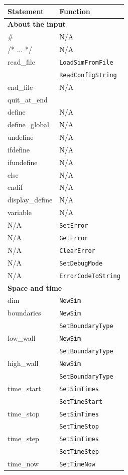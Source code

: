 \documentclass {book}
\newcommand {\ttt} {\texttt}
\begin{document}
\begin{longtable}[c]{ll}
Statement & Function\\
\hline
\multicolumn{2}{l}{\hspace{0.3in}\textbf{About the input}}\\
\hline
\# & N/A\\
/* ... */ & N/A\\
read\_file & \ttt{LoadSimFromFile}\\
& \ttt{ReadConfigString}\\
end\_file & N/A\\
quit\_at\_end \\ %
define & N/A\\
define\_global & N/A\\
undefine & N/A\\
ifdefine & N/A\\
ifundefine & N/A\\
else & N/A\\
endif & N/A\\
display\_define & N/A\\
variable & N/A\\ %
N/A & \ttt{SetError}\\
N/A & \ttt{GetError}\\
N/A & \ttt{ClearError}\\
N/A & \ttt{SetDebugMode}\\
N/A & \ttt{ErrorCodeToString}\\
\hline
\multicolumn{2}{l}{\hspace{0.3in}\textbf{Space and time}}\\
\hline
dim & \ttt{NewSim}\\
boundaries & \ttt{NewSim}\\
& \ttt{SetBoundaryType}\\
low\_wall & \ttt{NewSim}\\
& \ttt{SetBoundaryType}\\
high\_wall & \ttt{NewSim}\\
& \ttt{SetBoundaryType}\\
time\_start & \ttt{SetSimTimes}\\
& \ttt{SetTimeStart}\\
time\_stop & \ttt{SetSimTimes}\\
& \ttt{SetTimeStop}\\
time\_step & \ttt{SetSimTimes}\\
& \ttt{SetTimeStep}\\
time\_now & \ttt{SetTimeNow}\\

\end{longtable}
\end{document}
